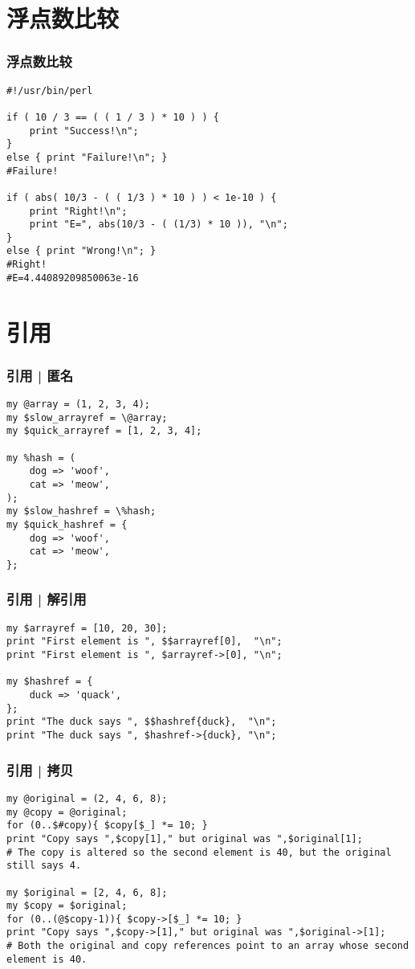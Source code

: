\section{浮点数比较}
\begin{frame}[fragile]
  \frametitle{浮点数比较}
\begin{lstlisting}[basicstyle=\small\tt]
#!/usr/bin/perl

if ( 10 / 3 == ( ( 1 / 3 ) * 10 ) ) {
    print "Success!\n";
}
else { print "Failure!\n"; }
#Failure!

if ( abs( 10/3 - ( ( 1/3 ) * 10 ) ) < 1e-10 ) {
    print "Right!\n";
    print "E=", abs(10/3 - ( (1/3) * 10 )), "\n";
}
else { print "Wrong!\n"; }
#Right!
#E=4.44089209850063e-16
\end{lstlisting}
\end{frame}

\section{引用}
\begin{frame}[fragile]
  \frametitle{引用 | 匿名}
\begin{lstlisting}
my @array = (1, 2, 3, 4);
my $slow_arrayref = \@array;
my $quick_arrayref = [1, 2, 3, 4];

my %hash = (
    dog => 'woof',
    cat => 'meow',
);
my $slow_hashref = \%hash;
my $quick_hashref = {
    dog => 'woof',
    cat => 'meow',
};
\end{lstlisting}
\end{frame}

\begin{frame}[fragile]
  \frametitle{引用 | 解引用}
\begin{lstlisting}
my $arrayref = [10, 20, 30];
print "First element is ", $$arrayref[0],  "\n";
print "First element is ", $arrayref->[0], "\n";

my $hashref = {
    duck => 'quack',
};
print "The duck says ", $$hashref{duck},  "\n";
print "The duck says ", $hashref->{duck}, "\n";
\end{lstlisting}
\end{frame}

\begin{frame}[fragile]
  \frametitle{引用 | 拷贝}
\begin{lstlisting}
my @original = (2, 4, 6, 8);
my @copy = @original;
for (0..$#copy){ $copy[$_] *= 10; }
print "Copy says ",$copy[1]," but original was ",$original[1];
# The copy is altered so the second element is 40, but the original still says 4.

my $original = [2, 4, 6, 8];
my $copy = $original;
for (0..(@$copy-1)){ $copy->[$_] *= 10; }
print "Copy says ",$copy->[1]," but original was ",$original->[1];
# Both the original and copy references point to an array whose second element is 40.
\end{lstlisting}
\end{frame}


